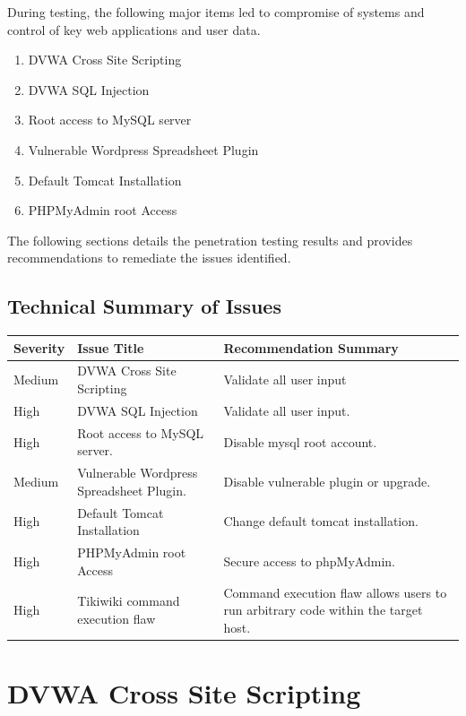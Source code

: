 \documentclass{article}
\begin{document}
During testing, the following major items led to compromise of systems and control
of key web applications and user data.

\begin{enumerate}
  \item DVWA Cross Site Scripting
  \item DVWA SQL Injection
  \item Root access to MySQL server
  \item Vulnerable Wordpress Spreadsheet Plugin
  \item Default Tomcat Installation
  \item PHPMyAdmin root Access
\end{enumerate}

The following sections details the penetration testing results and provides
recommendations to remediate the issues identified.

\subsection{Technical Summary of Issues}

\begin{center}
  \begin{tabular}{| l | l | | l |}
    \hline
    \textbf{Severity} & \textbf{Issue Title} & \textbf{Recommendation Summary} \\ \hline \hline
    Medium & DVWA Cross Site Scripting & Validate all user input \\ \hline
    High & DVWA SQL Injection & Validate all user input. \\ \hline
    High & Root access to MySQL server. & Disable mysql root account. \\ \hline
    Medium & Vulnerable Wordpress Spreadsheet Plugin. & Disable vulnerable plugin or upgrade. \\ \hline
    High & Default Tomcat Installation & Change default tomcat installation. \\ \hline
    High & PHPMyAdmin root Access & Secure access to phpMyAdmin. \\ \hline
    High & Tikiwiki command execution flaw & Command execution flaw allows users to run arbitrary code within the target host. \\ \hline
    \hline
  \end{tabular}
\end{center}

\newpage
\section{DVWA Cross Site Scripting}
\end{document}
